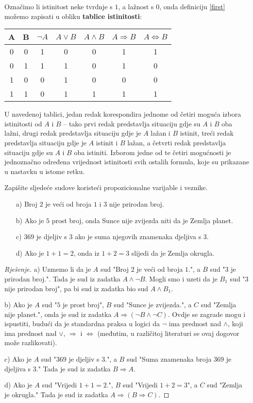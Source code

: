 Označimo li istinitost neke tvrdnje s $1$, a lažnost s $0$, onda definiciju \ref{first} možemo zapisati u obliku \textbf{tablice istinitosti}:
\begin{center}
\begin{tabular}{ |c|c||c|c|c|c|c| } 
 \hline
 A & B & $\neg A$ & $A\vee B$ & $A\wedge B$ & $A\Rightarrow B$ & $A \Leftrightarrow B$ \\
 \hline \hline
 0 & 0 & 1 & 0 & 0 & 1 & 1 \\ 
 0 & 1 & 1 & 1 & 0 & 1 & 0 \\ 
 1 & 0 & 0 & 1 & 0 & 0 & 0 \\
 1 & 1 & 0 & 1 & 1 & 1 & 1 \\
 \hline
\end{tabular}
\end{center}
U navedenoj tablici, jedan redak korespondira jednome od četiri moguća izbora istinitosti od $A$ i $B$ -- tako prvi redak predstavlja situaciju gdje su $A$ i $B$ oba lažni, drugi redak predstavlja situaciju gdje je $A$ lažan i $B$ istinit, treći redak predstavlja situaciju gdje je $A$ istinit i $B$ lažan, a četvrti redak predstavlja situaciju gdje su $A$ i $B$ oba istiniti. Izborom jedne od te četiri mogućnosti je jednoznačno određena vrijednost istinitosti svih ostalih formula, koje su prikazane u nastavku u istome retku.
\begin{exercise}
Zapišite sljedeće sudove koristeći propozicionalne varijable i veznike.
\begin{itemize}
\item[a)] Broj $2$ je veći od broja $1$ i $3$ nije prirodan broj.
\item[b)] Ako je $5$ prost broj, onda Sunce nije zvijezda niti da je Zemlja planet.
\item[c)] $369$ je djeljiv s $3$ ako je suma njegovih znamenaka djeljiva s $3$.
\item[d)] Ako je $1+1=2$, onda iz $1+2=3$ slijedi da je Zemlja okrugla.
\end{itemize}
\end{exercise}
\begin{proof}[Rješenje]
a) Uzmemo li da je $A$ sud "Broj $2$ je veći od broja $1$.", a $B$ sud "$3$ je prirodan broj.". Tada je sud iz zadatka $A\wedge \neg B$. Mogli smo i uzeti da je $B_1$ sud "$3$ nije prirodan broj", pa bi sud iz zadatka bio sud $A\wedge B_1$.

b) Ako je $A$ sud "$5$ je prost broj", $B$ sud "Sunce je zvijezda.", a $C$ sud "Zemlja nije planet.", onda je sud iz zadatka $A\Rightarrow (\neg B\wedge \neg C)$. Ovdje se zagrade mogu i ispustiti, budući da je standardna praksa u logici da $\neg$ ima prednost nad $\wedge$, koji ima prednost nad $\vee$, $\Rightarrow$ i $\Leftrightarrow$ (međutim, u različitoj literaturi se ovaj dogovor može razlikovati).

c) Ako je $A$ sud "$369$ je djeljiv s $3$.", a $B$ sud "Suma znamenaka broja $369$ je djeljiva s $3$." Tada je sud iz zadatka $B\Rightarrow A$.

d) Ako je $A$ sud "Vrijedi $1+1=2$.", $B$ sud "Vrijedi $1+2=3$", a $C$ sud "Zemlja je okrugla." Tada je sud iz zadatka $A\Rightarrow(B\Rightarrow C)$.
\end{proof}
